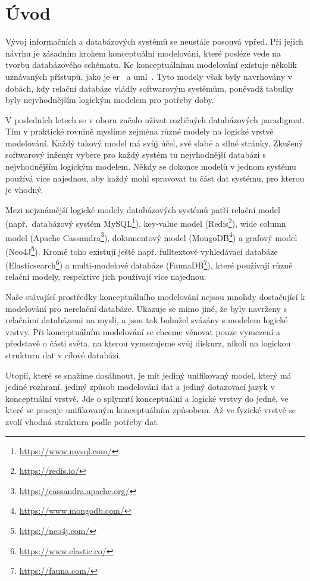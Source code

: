 \chapter*{Úvod}

Vývoj informačních a databázových systémů se neustále posouvá vpřed.
Při jejich návrhu je zásadním krokem konceptuální modelování, které posléze vede na tvorbu databázového schématu.
Ke konceptuálnímu modelování existuje několik uznávaných přístupů, jako je \acrfull{er}~\cite{chen_er_1976} a \acrfull{uml}~\cite{omg_uml_2017}.
Tyto modely však byly navrhovány v dobách, kdy relační databáze vládly softwarovým systémům, poněvadž tabulky byly nejvhodnějším logickým modelem pro potřeby doby.

V posledních letech se v oboru začalo užívat rozličných databázových paradigmat.
Tím v praktické rovnině myslíme zejména různé modely na logické vrstvě modelování.
Každý takový model má svůj účel, své slabé a silné stránky.
Zkušený softwarový inženýr vybere pro každý systém tu nejvhodnější databázi s nejvhodnějším logickým modelem.
Někdy se dokonce modelů v jednom systému používá více najednou, aby každý mohl spravovat tu část dat systému, pro kterou je vhodný.

Mezi nejznámější logické modely databázových systémů patří
relační model (např.~databázový systém MySQL\footnote{\url{https://www.mysql.com/}}),
key-value model (Redis\footnote{\url{https://redis.io/}}),
wide column model (Apache Cassandra\footnote{\url{https://cassandra.apache.org/}}),
dokumentový model (MongoDB\footnote{\url{https://www.mongodb.com/}}) a 
grafový model (Neo4J\footnote{\url{https://neo4j.com/}}).
Kromě toho existují ještě např. fulltextové vyhledávací databáze (Elasticsearch\footnote{\url{https://www.elastic.co/}}) a
multi-modelové databáze (FaunaDB\footnote{\url{https://fauna.com/}}), které používají různé relační modely, respektive jich používají více najednou.

Naše stávající prostředky konceptuálního modelování nejsou mnohdy dostačující k modelování pro nerelační databáze.
Ukazuje se mimo jiné, že byly navrženy s relačními databázemi na mysli, a jsou tak bohužel svázány s modelem logické vrstvy.
Při konceptuálním modelování se chceme věnovat pouze vymezení a představě o části světa, na kterou vymezujeme svůj diskurz, nikoli na logickou strukturu dat v cílové databázi.

Utopií, které se snažíme dosáhnout, je mít jediný unifikovaný model, který má jediné rozhraní, jediný způsob modelování dat a jediný dotazovací jazyk v konceptuální vrstvě.
Jde o splynutí konceptuální a logické vrstvy do jedné, ve které se pracuje unifikovaným konceptuálním způsobem.
Až ve fyzické vrstvě se zvolí vhodná struktura podle potřeby dat.

